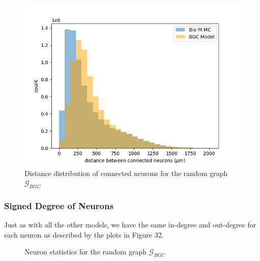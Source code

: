 \begin{figure}[H]
\begin{center}
\captionsetup{justification=centering}
\includegraphics[width=12cm]{GBC/Block_dist_distr.png}
\caption{Distance distribution of connected neurons for the random graph $\mathcal{G}_{BGC}$}
\end{center}
\end{figure}

\subsubsection{Signed Degree of Neurons}
Just as with all the other models, we have the same in-degree and out-degree for each neuron as described by the plots in Figure 32.

\begin{figure}[H]%
    \centering
    \captionsetup{justification=centering}
    \qquad
    \caption{Neuron statistics for the random graph $\mathcal{G}_{BGC}$}%
    \label{fig:example}%
\end{figure}




